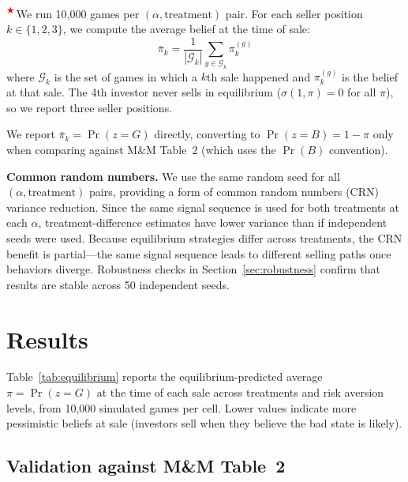 \documentclass[11pt]{article}
\newcommand{\extension}{\textsuperscript{\textcolor{red}{$\bigstar$}}\,}
\begin{document}
\extension We run 10{,}000 games per $(\alpha, \text{treatment})$ pair. For
each seller position $k \in \{1, 2, 3\}$, we compute the average belief at
the time of sale:
\[
    \bar{\pi}_k = \frac{1}{|\mathcal{G}_k|}
    \sum_{g \in \mathcal{G}_k} \pi_k^{(g)}
\]
where $\mathcal{G}_k$ is the set of games in which a $k$th sale happened and
$\pi_k^{(g)}$ is the belief at that sale. The 4th investor never sells in
equilibrium ($\sigma(1, \pi) = 0$ for all $\pi$), so we report three seller
positions.

We report $\bar{\pi}_k = \Pr(z = G)$ directly, converting to $\Pr(z = B) =
1 - \pi$ only when comparing against M\&M Table~2 (which uses the $\Pr(B)$
convention).

\textbf{Common random numbers.} We use the same random seed for all
$(\alpha, \text{treatment})$ pairs, providing a form of common random
numbers (CRN) variance reduction. Since the same signal sequence is used
for both treatments at each $\alpha$, treatment-difference estimates have
lower variance than if independent seeds were used. Because equilibrium
strategies differ across treatments, the CRN benefit is partial---the same
signal sequence leads to different selling paths once behaviors diverge.
Robustness checks in Section~\ref{sec:robustness} confirm that results are
stable across 50 independent seeds.

\section{Results}

Table~\ref{tab:equilibrium} reports the equilibrium-predicted average
$\pi = \Pr(z = G)$ at the time of each sale across treatments and risk
aversion levels, from 10{,}000 simulated games per cell. Lower values
indicate more pessimistic beliefs at sale (investors sell when they believe
the bad state is likely).

\begin{table}[h]
\centering
\small

\caption{Equilibrium predictions: average $\pi = \Pr(z = G)$ at each seller
position. The 4th investor never sells ($n = 1$ boundary condition).}
\label{tab:equilibrium}
\end{table}

\subsection{Validation against M\&M Table~2}
\end{document}
